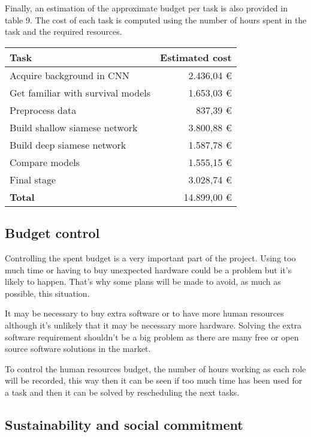 Finally, an estimation of the approximate budget per task is also provided in table 9. The
cost of each task is computed using the number of hours spent in the task and the required
resources.

\begin{table}[H]
  \centering
  \begin{tabular}{|l|r|}
    \hline
    \textbf{Task} & \textbf{Estimated cost} \\ 
    \hline\hline

    Acquire background in CNN & 2.436,04 € \\ \hline
    Get familiar with survival models & 1.653,03 € \\ \hline
    Preprocess data & 837,39 € \\ \hline
    Build shallow siamese network & 3.800,88 € \\ \hline
    Build deep siamese network & 1.587,78 € \\ \hline
    Compare models & 1.555,15 € \\ \hline
    Final stage & 3.028,74 € \\ 

    \hline\hline
    \textbf{Total} & 14.899,00 € \\ \hline
  \end{tabular}
\end{table}


\subsection{Budget control}

Controlling the spent budget is a very important part of the project. Using too much time or 
having to buy unexpected hardware could be a problem but it's likely to happen. That's why
some plans will be made to avoid, as much as possible, this situation.

It may be necessary to buy extra software or to have more human resources although it's
unlikely that it may be necessary more hardware. Solving the extra software requirement
shouldn't be a big problem as there are many free or open source software solutions in
the market.

To control the human resources budget, the number of hours working as each role will be 
recorded, this way then it can be seen if too much time has been used for a task and then
it can be solved by rescheduling the next tasks.

\subsection{Sustainability and social commitment}

